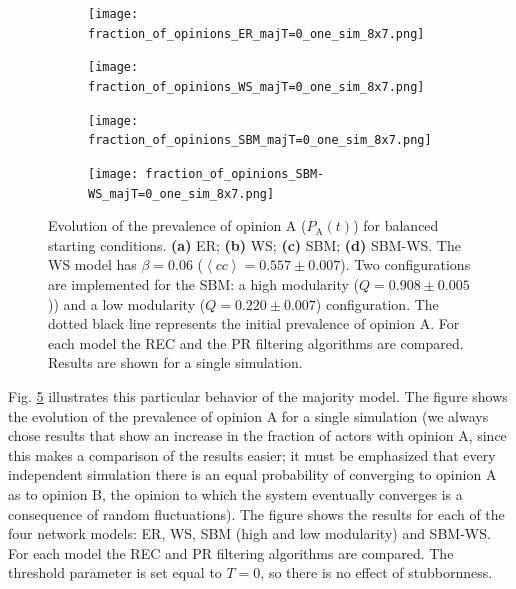 \documentclass[11 pt , letterpaper , twoside , openright]{book}
\begin{document}
\begin{figure}[H]
  \begin{subfigure}[b]{0.49\textwidth}
    \caption{}
  	\texttt{[image: fraction\_of\_opinions\_ER\_majT=0\_one\_sim\_8x7.png]}
    \label{er_majT}
  \end{subfigure}
  \begin{subfigure}[b]{0.49\textwidth}
    \caption{}
  	\texttt{[image: fraction\_of\_opinions\_WS\_majT=0\_one\_sim\_8x7.png]}
    \label{ws_majT}
  \end{subfigure}
  \begin{subfigure}[b]{0.49\textwidth}
    \caption{}
    \texttt{[image: fraction\_of\_opinions\_SBM\_majT=0\_one\_sim\_8x7.png]}
    \label{sbm_majT}
  \end{subfigure}
  \begin{subfigure}[b]{0.49\textwidth}
    \caption{}
    \texttt{[image: fraction\_of\_opinions\_SBM-WS\_majT=0\_one\_sim\_8x7.png]}
    \label{sbm-ws_majT}
  \end{subfigure}
  \captionsetup{format=plain}
  \caption[Evolution of the prevalence of opinion A ($P_\text{A}(t)$) for balanced starting conditions. Results for one simulation of the majority threshold model with $T=0$.]{Evolution of the prevalence of opinion A ($P_\text{A}(t)$) for balanced starting conditions. \textbf{(a)} ER; \textbf{(b)} WS; \textbf{(c)} SBM; \textbf{(d)} SBM-WS. The WS model has $\beta = 0.06$ ($\left<cc\right> = 0.557 \pm 0.007$). Two configurations are implemented for the SBM: a high modularity ($Q = 0.908 \pm 0.005$)) and a low modularity ($Q = 0.220 \pm 0.007$) configuration. The dotted black line represents the initial prevalence of opinion A. For each model the REC and the PR filtering algorithms are compared. Results are shown for a single simulation.}
\label{ev_op_majT_one_sim}
\end{figure}
\noindent
Fig. \ref{ev_op_majT_one_sim} illustrates this particular behavior of the majority model. The figure shows the evolution of the prevalence of opinion A for a single simulation (we always chose results that show an increase in the fraction of actors with opinion A, since this makes a comparison of the results easier; it must be emphasized that every independent simulation there is an equal probability of converging to opinion A as to opinion B, the opinion to which the system eventually converges is a consequence of random fluctuations). The figure shows the results for each of the four network models: ER, WS, SBM (high and low modularity) and SBM-WS. For each model the REC and PR filtering algorithms are compared. The threshold parameter is set equal to $T=0$, so there is no effect of stubbornness.\\
\end{document}

